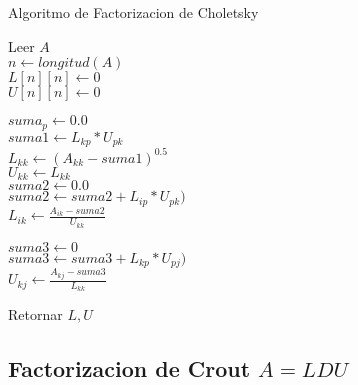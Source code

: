\documentclass[12pt]{article}
\begin{document}
        \begin{algorithm}[H]
            \caption{Algoritmo de Factorizacion de Choletsky}
            Leer $A$\\
            $n \leftarrow longitud(A)$\\
            $L[n][n] \leftarrow 0$\\
            $U[n][n] \leftarrow 0$\\
            {
                $suma_p \leftarrow 0.0$\\
                {
                    $suma1 \leftarrow L_{kp} * U_{pk}$\\
                }
                $L_{kk} \leftarrow (A_{kk} - suma1)^{0.5}$\\
                $U_{kk} \leftarrow L_{kk}$\\
                {
                    $suma2 \leftarrow 0.0$\\
                    {
                        $suma2 \leftarrow suma2 + L_{ip} * U_{pk})$\\
                    }
                    $L_{ik} \leftarrow \frac{A_{ik} - suma2}{U_{kk}}$\\
                }

                {
                    $suma3 \leftarrow 0$\\
                    {
                        $suma3 \leftarrow suma3 + L_{kp} * U_{pj})$\\
                    }
                    $U_{kj} \leftarrow \frac{A_{kj} - suma3}{L_{kk}}$\\
                }

            }
            Retornar $L, U$
            
        \end{algorithm}

        \subsection{Factorizacion de Crout $A = LDU$}
        
\end{document}
